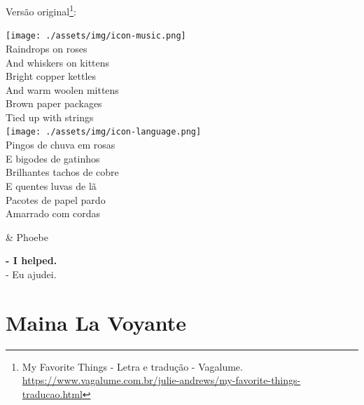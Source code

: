 Versão original\footnote{\sloppy My Favorite Things - Letra e tradução - Vagalume. \url{https://www.vagalume.com.br/julie-andrews/my-favorite-things-traducao.html}}:

\bigskip
\begin{tcolorbox}[enhanced,
    drop fuzzy shadow southeast, boxrule=0.3pt,
    lower separated=false, sidebyside, sidebyside align=top,
    halign=flush right, halign lower=left, breakable,
    colframe=black!30!dialogoBorder,colback=musicaBg]
\texttt{[image: ./assets/img/icon-music.png]}\\
Raindrops on roses\\And whiskers on kittens\\Bright copper kettles\\And warm woolen mittens\\Brown paper packages\\Tied up with strings\\
\tcblower
\texttt{[image: ./assets/img/icon-language.png]}\\
Pingos de chuva em rosas\\E bigodes de gatinhos\\Brilhantes tachos de cobre\\E quentes luvas de lã\\Pacotes de papel pardo\\Amarrado com cordas\\
\end{tcolorbox}

\begin{tcolorbox}[enhanced,center upper,
    drop fuzzy shadow southeast, boxrule=0.3pt,
    lower separated=false, breakable,
    colframe=black!30!dialogoBorder,colback=white]
\begin{minipage}[c]{0.16\linewidth}
   & \centering \scriptsize{Phoebe}
\end{minipage}
\hfill
\begin{minipage}[c]{0.8\linewidth}
  \textbf{- I helped.}\\
  - Eu ajudei.
\end{minipage}
\end{tcolorbox}

\hypertarget{maina-la-voyante}{%
\section{Maina La Voyante}\label{maina-la-voyante}}

